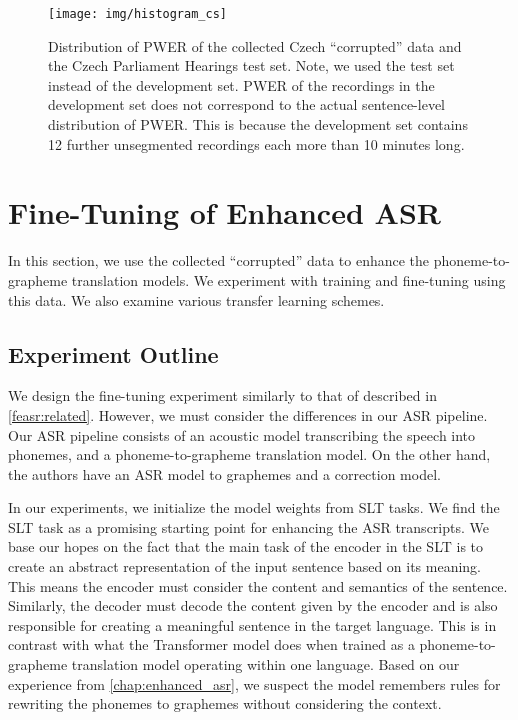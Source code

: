 \begin{figure}[t]
	\texttt{[image: img/histogram\_cs]}
	\caption{Distribution of PWER of the collected Czech ``corrupted'' data and the Czech Parliament Hearings test set. Note, we used the test set instead of the development set. PWER of the recordings in the development set does not correspond to the actual sentence-level distribution of PWER. This is because the development set contains 12  further unsegmented recordings each more than 10 minutes long.}
	\label{fig:histogram_cs}
\end{figure}






\section{Fine-Tuning of Enhanced ASR}
In this section, we use the collected ``corrupted'' data to enhance the phoneme-to-grapheme translation models. We experiment with training and fine-tuning using this data. We also examine various transfer learning schemes.

\subsection{Experiment Outline}
We design the fine-tuning experiment similarly to that of  described in \cref{feasr:related}. However, we must consider the differences in our ASR pipeline. Our ASR pipeline consists of an acoustic model transcribing the speech into phonemes, and a phoneme-to-grapheme translation model. On the other hand, the authors have an ASR model to graphemes and a correction model.

In our experiments, we initialize the model weights from SLT tasks. We find the SLT task as a promising starting point for enhancing the ASR transcripts. We base our hopes on the fact that the main task of the encoder in the SLT is to create an abstract representation of the input sentence based on its meaning. This means the encoder must consider the content and semantics of the sentence. Similarly, the decoder must decode the content given by the encoder and is also responsible for creating a meaningful sentence in the target language. This is in contrast with what the Transformer model does when trained as a phoneme-to-grapheme translation model operating within one language. Based on our experience from \cref{chap:enhanced_asr}, we suspect the model remembers rules for rewriting the phonemes to graphemes without considering the context. 


